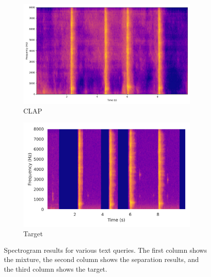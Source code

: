 \begin{figure}[htbp]
\begin{subfigure}[b]{0.185\textwidth}
        \includegraphics[width=\textwidth]{plots/sword_swoosh/clap sep_spectrogram.png}
        \caption*{CLAP}
    \end{subfigure}
    \begin{subfigure}[b]{0.185\textwidth}
        \centering
        \includegraphics[width=\textwidth]{plots/sword_swoosh/clap target_spectrogram.png}
        \caption*{Target}
    \end{subfigure}
    

    \caption{Spectrogram results for various text queries. The first column shows the mixture, the second column shows the separation results, and the third column shows the target.}
    
    \label{fig:separation_results}

\end{figure}
